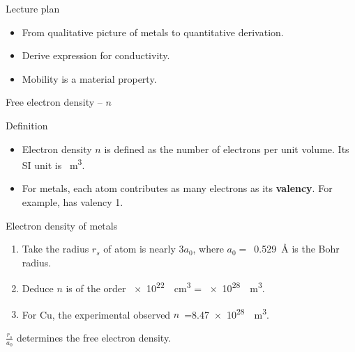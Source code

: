 %
%
\begin{frame}{Lecture plan}
	\begin{learningobjectives}
		\begin{itemize}
			\item From qualitative picture of metals to quantitative derivation.
			\item Derive expression for conductivity.
			\item Mobility is a material property.
		\end{itemize}
	\end{learningobjectives}
\end{frame}
%
%
\begin{frame}{Free electron density -- \(n\)}
	\begin{block}{Definition}
		\begin{itemize}
			\item Electron density \(n\) is defined as the number of electrons per unit volume. Its SI unit is \si{\per\metre\cubed}.
			\item For metals, each atom contributes as many electrons as its \textbf{valency}. For example,  has valency 1.
		\end{itemize}
	\end{block}
	\begin{guesstimate}{Electron density of metals}
		\begin{enumerate}\itemsep0pt\parskip0pt 
			\item Take the radius \(r_s\) of atom is nearly $3 a_0$, where \(a_0 =\)~\SI{0.529}{\angstrom} is the Bohr radius.
			\item Deduce \(n\) is of the order \SI{e22}{\per\centi\metre\cubed} =  \SI{e28}{\per\metre\cubed}.
			\item For Cu, the experimental observed \(n\)~=\SI{8.47e28}{\per\metre\cubed}.
		\end{enumerate}
	\end{guesstimate}
	\vfill
	\begin{keyinsight}
		\(\tfrac{r_s}{a_0}\) determines the free electron density.
	\end{keyinsight}
\end{frame}
%
